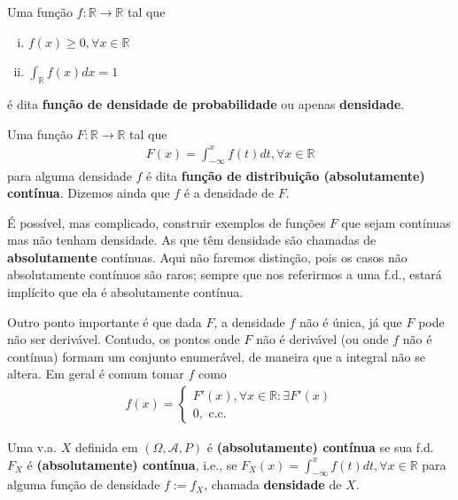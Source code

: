 \documentclass[../Notas.tex]{subfiles}
\begin{document}
\begin{definition}
Uma função $f:\mathbb{R}\to\mathbb{R}$ tal que
\begin{enumerate}[(i)]
    \item $f(x)\geq 0, \forall x\in\mathbb{R}$ 
    \item $\displaystyle{ \int_{\mathbb{R}} f(x)dx  = 1}$
\end{enumerate}
é dita \textbf{função de densidade de probabilidade} ou apenas \textbf{densidade}.
\end{definition}

\begin{definition}
Uma função $F:\mathbb{R}\to\mathbb{R}$ tal que
\begin{align*}
    F(x) = \int_{-\infty}^x f(t) dt, \forall x\in\mathbb{R}
\end{align*}
para alguma densidade $f$ é dita \textbf{função de distribuição (absolutamente) contínua}. Dizemos ainda que $f$ é a densidade de $F$.
\end{definition}

\begin{remark}
É possível, mas complicado, construir exemplos de funções $F$ que sejam contínuas mas não tenham densidade. As que têm densidade são chamadas de \textbf{absolutamente} contínuas. Aqui não faremos distinção, pois os casos não absolutamente contínuos são raros; sempre que nos referirmos a uma f.d., estará implícito que ela é absolutamente contínua.

Outro ponto importante é que dada $F$, a densidade $f$ não é única, já que $F$ pode não ser derivável. Contudo, os pontos onde $F$ não é derivável (ou onde $f$ não é contínua) formam um conjunto enumerável, de maneira que a integral não se altera. Em geral é comum tomar $f$ como
\begin{align*}
    f(x) = \begin{cases}
    F'(x), \forall x\in\mathbb{R} : \exists F'(x) \\
    0, \text{ c.c.}
    \end{cases}
\end{align*}
\end{remark}

\begin{definition}
Uma v.a. $X$ definida em $(\Omega, \mathcal{A}, P)$ é \textbf{(absolutamente) contínua} se sua f.d. $F_X$ é \textbf{(absolutamente) contínua}, i.e., se $F_X(x) = \displaystyle{ \int_{-\infty}^x f(t)dt, \forall x\in\mathbb{R} }$ para alguma função de densidade $f:=f_X$, chamada \textbf{densidade} de $X$.
\end{definition}
\end{document}
